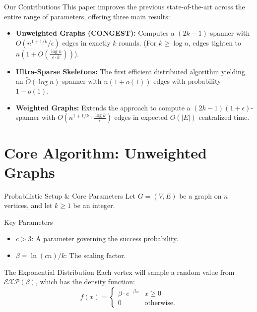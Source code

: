 \documentclass{beamer}
\begin{document}
\begin{frame}{Our Contributions}
    This paper improves the previous state-of-the-art across the entire range of parameters, offering three main results:
    \vspace{0.4cm}
    
    \begin{itemize}
        \item \textbf{Unweighted Graphs (CONGEST):} Computes a $(2k - 1)$-spanner with $O(n^{1+1/k}/\epsilon)$ edges in exactly $k$ rounds. (For $k \ge \log n$, edges tighten to $n(1 + O(\frac{\log n}{\epsilon \cdot k}))$).
        
        \vspace{0.3cm}
        \item \textbf{Ultra-Sparse Skeletons:} The first efficient distributed algorithm yielding an $\tilde{O}(\log n)$-spanner with $n(1 + o(1))$ edges with probability $1 - o(1)$.
        
        \vspace{0.3cm}
        \item \textbf{Weighted Graphs:} Extends the approach to compute a $(2k - 1)(1 + \epsilon)$-spanner with $O(n^{1+1/k} \cdot \frac{\log k}{\epsilon})$ edges in expected $O(|E|)$ centralized time.
    \end{itemize}
\end{frame}

\section{Core Algorithm: Unweighted Graphs}

\begin{frame}{Probabilistic Setup \& Core Parameters}
    Let $G = (V,E)$ be a graph on $n$ vertices, and let $k \ge 1$ be an integer.
    
    \vspace{0.3cm}
    \begin{block}{Key Parameters}
        \begin{itemize}
            \item $c > 3$: A parameter governing the success probability.
            \item $\beta = \ln(cn)/k$: The scaling factor.
        \end{itemize}
    \end{block}
    
    \vspace{0.3cm}
    \begin{block}{The Exponential Distribution}
        Each vertex will sample a random value from $\mathcal{EXP}(\beta)$, which has the density function:
        \[ 
        f(x) = \begin{cases} 
        \beta \cdot e^{-\beta x} & x \ge 0 \\ 
        0 & \text{otherwise.} 
        \end{cases} 
        \]
    \end{block}
\end{frame}
\end{document}
